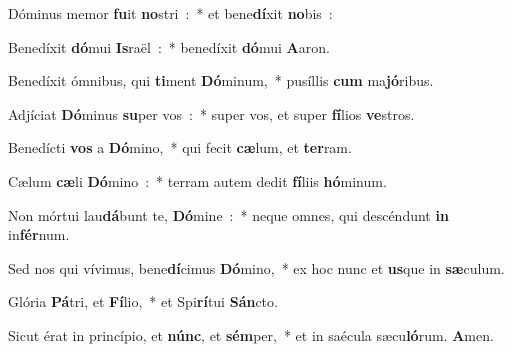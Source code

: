 \item Dóminus memor \textbf{fu}it \textbf{no}stri~:~* et bene\textbf{dí}xit \textbf{no}bis~:
\item Benedíxit \textbf{dó}mui \textbf{Is}raël~:~* benedíxit \textbf{dó}mui \textbf{A}aron.
\item Benedíxit ómnibus, qui \textbf{ti}ment \textbf{Dó}minum,~* pu\-síl\-lis \textbf{cum} ma\textbf{jó}ribus.
\item Adjíciat \textbf{Dó}minus \textbf{su}per vos~:~* super vos, et super \textbf{fí}\-li\-os \textbf{ve}stros.
\item Benedícti \textbf{vos} a \textbf{Dó}mino,~* qui fecit \textbf{cæ}lum, et \textbf{ter}ram.
\item Cælum \textbf{cæ}li \textbf{Dó}mino~:~* terram autem dedit \textbf{fí}liis \textbf{hó}\-mi\-num.
\item Non mórtui lau\textbf{dá}bunt te, \textbf{Dó}mine~:~* neque omnes, qui descéndunt \textbf{in} in\textbf{fér}num.
\item Sed nos qui vívimus, bene\textbf{dí}cimus \textbf{Dó}mino,~* ex hoc nunc et \textbf{us}que in \textbf{sæ}culum.
\item Glória \textbf{Pá}tri, et \textbf{Fí}lio,~* et Spi\textbf{rí}tui \textbf{Sán}cto.
\item Sicut érat in princípio, et \textbf{núnc}, et \textbf{sém}per,~* et in saé\-cu\-la sæcu\textbf{ló}rum. \textbf{A}men.
